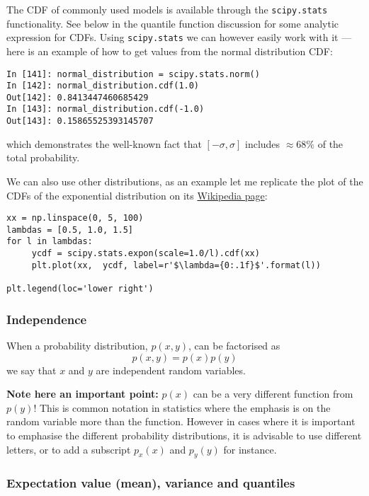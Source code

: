 \documentclass[a4paper,10pt]{article}
\newcommand{\link}[2]{{\color{blue}\href{#1}{#2}}}
\begin{document}
The CDF of commonly used models is available through the \texttt{scipy.stats} functionality. See below in the quantile function discussion for some analytic expression for CDFs. Using \texttt{scipy.stats} we can however easily work with it --- here is an example of how to get values from the normal distribution CDF:
\begin{lstlisting}
In [141]: normal_distribution = scipy.stats.norm() 
In [142]: normal_distribution.cdf(1.0)                                                                          
Out[142]: 0.8413447460685429
In [143]: normal_distribution.cdf(-1.0)                                                                         
Out[143]: 0.15865525393145707
\end{lstlisting}
which demonstrates the well-known fact that $[-\sigma, \sigma]$ includes $\approx 68\%$ of the total probability. 

We can also use other distributions, as an example let me replicate the plot of the CDFs of the exponential distribution on its \link{https://en.wikipedia.org/wiki/Exponential_distribution}{Wikipedia page}:
\begin{lstlisting}
xx = np.linspace(0, 5, 100)   
lambdas = [0.5, 1.0, 1.5]
for l in lambdas:
     ycdf = scipy.stats.expon(scale=1.0/l).cdf(xx)
     plt.plot(xx,  ycdf, label=r'$\lambda={0:.1f}$'.format(l))
     
plt.legend(loc='lower right')
\end{lstlisting}



\subsubsection{ Independence}

When a probability distribution, $p(x, y)$, can be factorised as
$$p(x, y) = p(x) p(y)$$ we say that $x$ and $y$ are independent random variables.

\textbf{Note here an important point:} $p(x)$ can be a very different function from $p(y)$! This is common notation in statistics where the emphasis is on the random variable more than the function. However in cases where it is important to emphasise the different probability distributions, it is advisable to use different letters, or to add a subscript $p_x(x)$ and $p_y(y)$ for instance.

\subsubsection{ Expectation value (mean), variance and quantiles}
\end{document}
